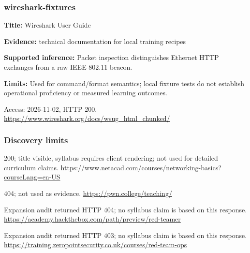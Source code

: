 \subsubsection{wireshark-fixtures}
\noindent\textbf{Title:} Wireshark User Guide\par
\noindent\textbf{Evidence:} technical documentation for local training recipes\par
\noindent\textbf{Supported inference:} Packet inspection distinguishes Ethernet HTTP exchanges from a raw IEEE 802.11 beacon.\par
\noindent\textbf{Limits:} Used for command/format semantics; local fixture tests do not establish operational proficiency or measured learning outcomes.\par
\noindent Access: 2026-11-02, HTTP 200. \url{https://www.wireshark.org/docs/wsug_html_chunked/}
\subsubsection{Discovery limits}
200; title visible, syllabus requires client rendering; not used for detailed curriculum claims. \url{https://www.netacad.com/courses/networking-basics?courseLang=en-US}\par
404; not used as evidence. \url{https://pwn.college/teaching/}\par
Expansion audit returned HTTP 404; no syllabus claim is based on this response. \url{https://academy.hackthebox.com/path/preview/red-teamer}\par
Expansion audit returned HTTP 403; no syllabus claim is based on this response. \url{https://training.zeropointsecurity.co.uk/courses/red-team-ops}\par
